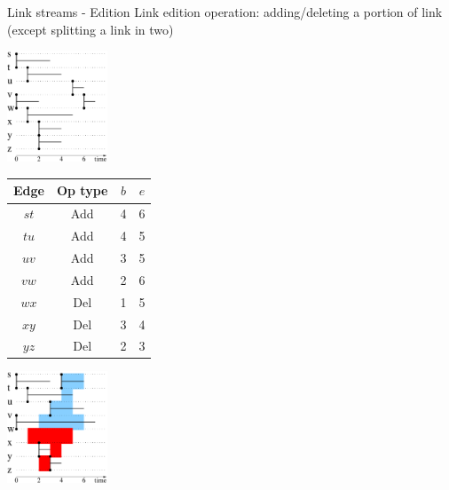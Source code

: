 \documentclass{beamer}
\newcommand\Fontvi{\fontsize{8}{8.2}\selectfont}
\begin{document}
\begin{frame}{Link streams - Edition}
  Link edition operation: adding/deleting a portion of link (except splitting a link in two)
  \Fontvi
  \begin{table}[!h]
    \begin{minipage}{0.3\linewidth}
      \centering
      \includegraphics[width=30mm]{ex_op0.pdf}
    \end{minipage}
    \begin{tabular}{c c c c}
      \toprule
      Edge & Op type & $b$ & $e$\\
      \midrule
      $st$ & Add & 4 & 6 \\
      $tu$ & Add & 4 & 5 \\
      $uv$ & Add & 3 & 5 \\
      $vw$ & Add & 2 & 6 \\
      $wx$ & Del & 1 & 5 \\
      $xy$ & Del & 3 & 4 \\
      $yz$ & Del & 2 & 3 \\
      \bottomrule
    \end{tabular}
    \begin{minipage}{0.3\linewidth}
      \centering
      \includegraphics[width=30mm]{ex_op1.pdf}
    \end{minipage}
  \end{table}
\end{frame}
\end{document}
